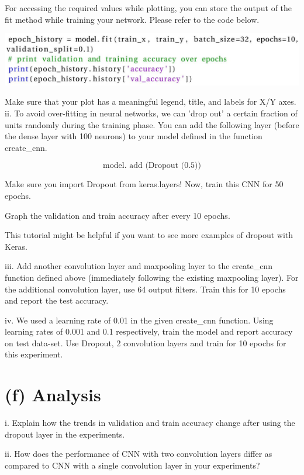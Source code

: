 \documentclass[10pt]{article}
\begin{document}
For accessing the required values while plotting, you can store the output of the fit method while training your network. Please refer to the code below.

\begin{center}
\includegraphics[max width=\textwidth]{2023_11_03_3a37fc63330e1b210712g-4(1)}
\end{center}

Make sure that your plot has a meaningful legend, title, and labels for X/Y axes.
ii. To avoid over-fitting in neural networks, we can 'drop out' a certain fraction of units randomly during the training phase. You can add the following layer (before the dense layer with 100 neurons) to your model defined in the function create\_cnn.

$$
\text { model. add (Dropout (0.5)) }
$$

Make sure you import Dropout from keras.layers! Now, train this CNN for 50 epochs.

Graph the validation and train accuracy after every 10 epochs.

This tutorial might be helpful if you want to see more examples of dropout with Keras.

iii. Add another convolution layer and maxpooling layer to the create\_cnn function defined above (immediately following the existing maxpooling layer). For the additional convolution layer, use 64 output filters. Train this for 10 epochs and report the test accuracy.

iv. We used a learning rate of 0.01 in the given create\_cnn function. Using learning rates of 0.001 and 0.1 respectively, train the model and report accuracy on test data-set. Use Dropout, 2 convolution layers and train for 10 epochs for this experiment.

\section*{(f) Analysis}
i. Explain how the trends in validation and train accuracy change after using the dropout layer in the experiments.

ii. How does the performance of CNN with two convolution layers differ as compared to CNN with a single convolution layer in your experiments?
\end{document}
